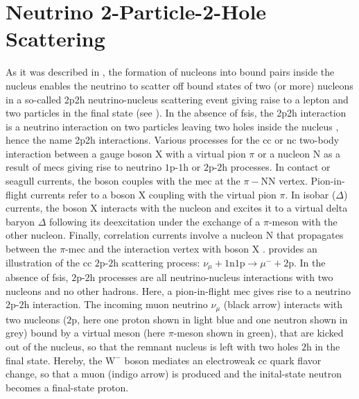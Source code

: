 \section{Neutrino 2-Particle-2-Hole Scattering} \label{sec:2p2h_scattering}
%
As it was described in , the formation of nucleons into bound pairs inside the nucleus enables the neutrino to scatter off bound states of two (or more) nucleons in a so-called \acrshort{2p2h} neutrino-nucleus scattering event giving raise to a lepton and two particles in the final state (see ). In the absence of \acrshort{fsi}s, the \acrshort{2p2h} interaction is a neutrino interaction on two particles leaving two holes inside the nucleus \cite{Gran:2013kda}, hence the name \acrlong{2p2h} interactions. Various processes for the \acrshort{cc} or \acrshort{nc} two-body interaction between a gauge boson $\text{X}$ with a virtual pion $\pi$ or a nucleon $\text{N}$ as a result of \acrshort{mec}s giving rise to neutrino $1\text{p}$-$1\text{h}$ or $2\text{p}$-$2\text{h}$ processes. In contact or seagull currents, the boson couples with the \acrshort{mec} at the $\pi-\text{NN}$ vertex. Pion-in-flight currents refer to a boson $\text{X}$ coupling with the virtual pion $\pi$. In isobar ($\Delta$) currents, the boson $\text{X}$ interacts with the nucleon and excites it to a virtual delta baryon $\Delta$ following its deexcitation under the exchange of a $\pi$-meson with the other nucleon. Finally, correlation currents involve a nucleon $\text{N}$ that propagates between the $\pi$-\acrshort{mec} and the interaction vertex with boson $\text{X}$ \cite{vancuyck}.
 provides an illustration of the \acrlong{cc} $2\text{p}$-$2\text{h}$ scattering process: $\nu_\mu + 1\text{n}1\text{p} \rightarrow \mu^- + 2\text{p}$. In the absence of \acrshort{fsi}s, $2\text{p}$-$2\text{h}$ processes are all neutrino-nucleus interactions with two nucleons and no other hadrons. Here, a pion-in-flight \acrshort{mec} gives rise to a neutrino $2\text{p}$-$2\text{h}$ interaction. The incoming muon neutrino $\nu_\mu$ (black arrow) interacts with two nucleons ($2\text{p}$, here one proton shown in light blue and one neutron shown in grey) bound by a virtual meson (here $\pi$-meson shown in green), that are kicked out of the nucleus, so that the remnant nucleus is left with two holes $2\text{h}$ in the final state. Hereby, the $\text{W}^-$ boson mediates an electroweak \acrshort{cc} quark flavor change, so that a muon (indigo arrow) is produced and the inital-state neutron becomes a final-state proton.
